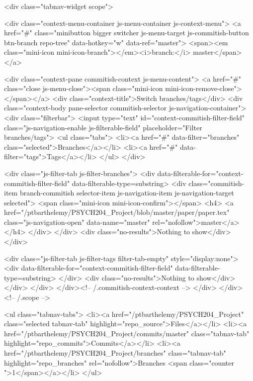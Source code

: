   <div class="tabnav-widget scope">


    <div class="context-menu-container js-menu-container js-context-menu">
      <a href="#"
         class="minibutton bigger switcher js-menu-target js-commitish-button btn-branch repo-tree"
         data-hotkey="w"
         data-ref="master">
         <span><em class="mini-icon mini-icon-branch"></em><i>branch:</i> master</span>
      </a>

      <div class="context-pane commitish-context js-menu-content">
        <a href="#" class="close js-menu-close"><span class="mini-icon mini-icon-remove-close"></span></a>
        <div class="context-title">Switch branches/tags</div>
        <div class="context-body pane-selector commitish-selector js-navigation-container">
          <div class="filterbar">
            <input type="text" id="context-commitish-filter-field" class="js-navigation-enable js-filterable-field" placeholder="Filter branches/tags">
            <ul class="tabs">
              <li><a href="#" data-filter="branches" class="selected">Branches</a></li>
                <li><a href="#" data-filter="tags">Tags</a></li>
            </ul>
          </div>

          <div class="js-filter-tab js-filter-branches">
            <div data-filterable-for="context-commitish-filter-field" data-filterable-type=substring>
                <div class="commitish-item branch-commitish selector-item js-navigation-item js-navigation-target selected">
                  <span class="mini-icon mini-icon-confirm"></span>
                  <h4>
                      <a href="/ptbarthelemy/PSYCH204_Project/blob/master/paper/paper.tex" class="js-navigation-open" data-name="master" rel="nofollow">master</a>
                  </h4>
                </div>
            </div>
            <div class="no-results">Nothing to show</div>
          </div>

            <div class="js-filter-tab js-filter-tags filter-tab-empty" style="display:none">
              <div data-filterable-for="context-commitish-filter-field" data-filterable-type=substring>
              </div>
              <div class="no-results">Nothing to show</div>
            </div>
        </div>
      </div><!-- /.commitish-context-context -->
    </div>
  </div> <!-- /.scope -->

  <ul class="tabnav-tabs">
    <li><a href="/ptbarthelemy/PSYCH204_Project" class="selected tabnav-tab" highlight="repo_source">Files</a></li>
    <li><a href="/ptbarthelemy/PSYCH204_Project/commits/master" class="tabnav-tab" highlight="repo_commits">Commits</a></li>
    <li><a href="/ptbarthelemy/PSYCH204_Project/branches" class="tabnav-tab" highlight="repo_branches" rel="nofollow">Branches <span class="counter ">1</span></a></li>
  </ul>

